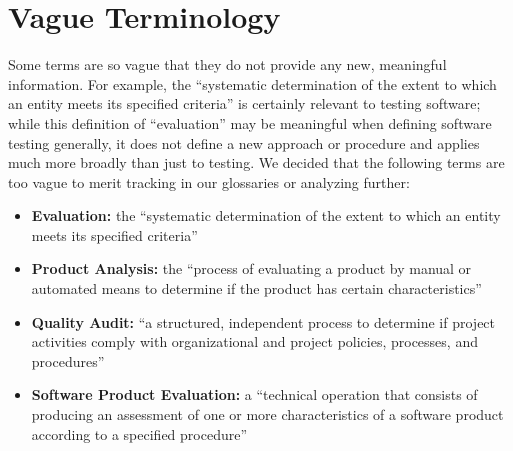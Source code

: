 \section{Vague Terminology}\label{vague-terms}

Some terms are so vague that they do not provide any new, meaningful
information. For example, the ``systematic determination of the extent to
which an entity meets its specified criteria'' \citep[p.~167]{IEEE2017} is
certainly relevant to testing software; while this definition of
``evaluation'' may be meaningful when defining software testing generally,
it does not define a new approach or procedure and applies much more
broadly than just to testing. We decided that the
following terms are too vague to merit tracking in our glossaries or
analyzing further:
\begin{itemize}
    \item \textbf{Evaluation:} the ``systematic determination of the extent
          to which an entity meets its specified criteria''
          \citep[p.~167]{IEEE2017}
    \item \textbf{Product Analysis:} the ``process of evaluating a product by
          manual or automated means to determine if the product has certain
          characteristics'' \citep[p.~343]{IEEE2017}
    \item \textbf{Quality Audit:} ``a structured, independent process to
          determine if project activities comply with organizational and
          project policies, processes, and procedures'' \citep[p.~361]{IEEE2017}
    \item \textbf{Software Product Evaluation:} a ``technical operation that
          consists of producing an assessment of one or more characteristics
          of a software product according to a specified procedure''
          \citep[p.~424]{IEEE2017}
\end{itemize}

